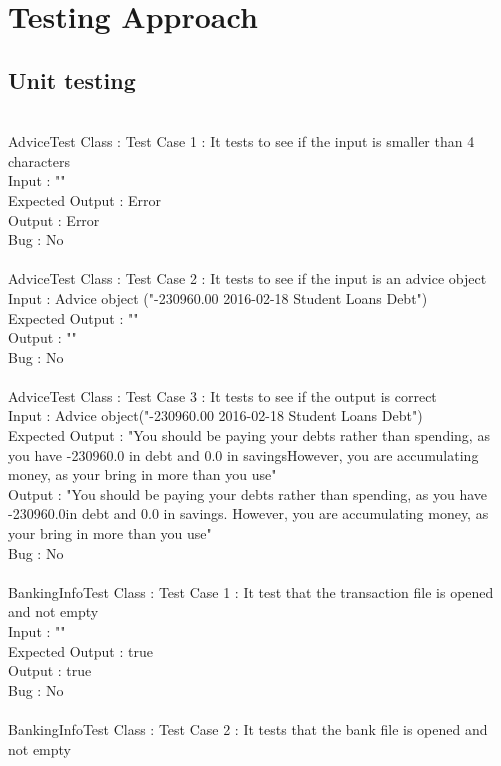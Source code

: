\documentclass{article}
\begin{document}
\newpage



\section{Testing Approach}
\subsection{Unit testing}
\\AdviceTest Class : Test Case 1 : It tests to see if the input is smaller than 4 characters
\\Input : ""
\\Expected Output : Error
\\Output : Error
\\Bug : No
\\\\AdviceTest Class : Test Case 2 : It tests to see if the input is an advice object
\\Input : Advice object ("-230960.00 2016-02-18 Student Loans Debt")
\\Expected Output : ""
\\Output : ""
\\Bug : No
\\\\AdviceTest Class : Test Case 3 : It tests to see if the output is correct
\\Input : Advice object("-230960.00 2016-02-18 Student Loans Debt")
\\Expected Output : "You should be paying your debts rather than spending, as you have -230960.0 in debt and 0.0 in savingsHowever, you are accumulating money, as your bring in more than you use"
\\Output : "You should be paying your debts rather than spending, as you have -230960.0in debt and 0.0 in savings. However, you are accumulating money, as your bring in more than you use"
\\Bug : No
\\\\BankingInfoTest Class : Test Case 1 : It test that the transaction file is opened and not empty
\\Input : ""
\\Expected Output : true
\\Output : true
\\Bug : No
\\\\BankingInfoTest Class : Test Case 2 : It tests that the bank file is opened and not empty
\end{document}
